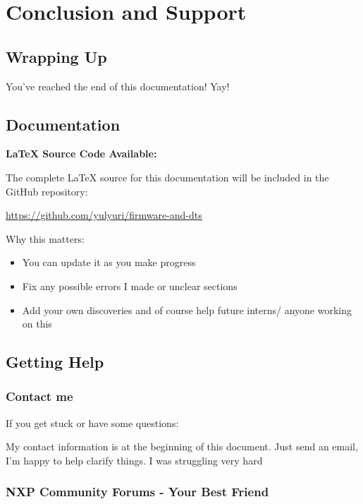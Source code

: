 \documentclass[12pt,a4paper]{report}
\begin{document}
\chapter{Conclusion and Support}

\section{Wrapping Up}

You've reached the end of this documentation! Yay!




\section{Documentation}

\begin{gitref}
\textbf{LaTeX Source Code Available:}

The complete LaTeX source for this documentation will be included in the GitHub repository:

\url{https://github.com/yulyuri/firmware-and-dts}

Why this matters:
\begin{itemize}
    \item You can update it as you make progress
    \item Fix any possible errors I made or unclear sections
    \item Add your own discoveries and of course help future interns/ anyone working on this
\end{itemize}
\end{gitref}

\section{Getting Help}

\subsection{Contact me}

If you get stuck or have some questions:

My contact information is at the beginning of this document. Just send an email, I'm happy to help clarify things. I was struggling very hard

\subsection{NXP Community Forums - Your Best Friend}
\end{document}
